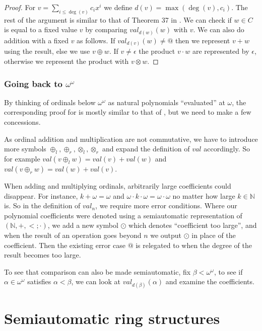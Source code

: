 \documentclass[british,a4paper,11pt,abstract=on]{scrreprt}
\theoremstyle{definition}
\theoremstyle{remark}
\newcommand{\N}{\mathbb{N}}
\begin{document}
\begin{proof}
    For \(v = \sum_{i \leq \deg(v)} c_i x^i\) we define \(d(v) = \max(\deg(v), c_i)\).
    The rest of the argument is similar to that of Theorem 37 in \autocite{semiauto}.
    We can check if
    \(w\in C\) is equal to a fixed value \(v\) by comparing \(val_{d(w)}(w)\) with \(v\).
    We can also do addition with a fixed \(v\) as follows.
    If \(val_{d(v)}(w) \ne @\) then we represent \(v+w\) using the result, else we use \(v\oplus w\).
    If \(v\ne \epsilon\) the product \(v\cdot w\) are represented by \(\epsilon\), otherwise we represent the product with \(v\otimes w\).
\end{proof}

\subsection{Going back to \texorpdfstring{\(\omega^\omega\)}{omega\textasciicircum omega}}

By thinking of ordinals below \(\omega^\omega\) as natural polynomials ``evaluated'' at \(\omega\),
the corresponding proof for  is mostly similar to that of ,
but we need to make a few concessions.

As ordinal addition and multiplication are not commutative,
we have to introduce more symbols \(\oplus_l, \oplus_r, \otimes_l, \otimes_r\) and expand the definition of \(val\) accordingly.
So for example \(val(v \oplus_l w) = val(v) + val(w)\) and \(val(v \oplus_r w) = val(w) + val(v)\).

When adding and multiplying ordinals, arbitrarily large coefficients could disappear.
For instance, \(k + \omega = \omega\) and \(\omega\cdot k\cdot\omega = \omega \cdot \omega\) no matter how large \(k\in\N\) is.
So in the definition of \(val_n\), we require more error conditions.
Where our polynomial coefficients were denoted using a semiautomatic representation of \((\N,+,<;\cdot)\),
we add a new symbol \(\odot\) which denotes ``coefficient too large'',
and when the result of an operation goes beyond \(n\) we output \(\odot\) in place of the coefficient.
Then the existing error case \(@\) is relegated to when the degree of the result becomes too large.

To see that comparison can also be made semiautomatic, fix \(\beta < \omega^\omega\), to see
if \(\alpha \in \omega^\omega\) satisfies \(\alpha < \beta\), we can look at \(val_{d(\beta)}(\alpha)\) and examine the coefficients.

\chapter{Semiautomatic ring structures}
\end{document}
